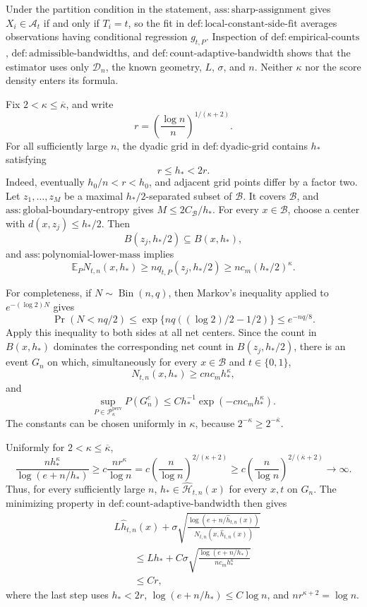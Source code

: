 Under the partition condition in the statement, \(\mathrm{ass:sharp\text{-}assignment}\) gives \(X_i\in\mathcal A_t\) if and only if \(T_i=t\), so the fit in \(\mathrm{def:local\text{-}constant\text{-}side\text{-}fit}\) averages observations having conditional regression \(g_{t,P}\).  Inspection of \(\mathrm{def:empirical\text{-}counts}\), \(\mathrm{def:admissible\text{-}bandwidths}\), and \(\mathrm{def:count\text{-}adaptive\text{-}bandwidth}\) shows that the estimator uses only \(\mathcal D_n\), the known geometry, \(L\), \(\sigma\), and \(n\).  Neither \(\kappa\) nor the score density enters its formula.

Fix \(2<\kappa\le\overline\kappa\), and write
\[
 r=\left(\frac{\log n}{n}\right)^{1/(\kappa+2)}.
\]
For all sufficiently large \(n\), the dyadic grid in \(\mathrm{def:dyadic\text{-}grid}\) contains \(h_*\) satisfying
\[
 r\le h_*<2r.
\]
Indeed, eventually \(h_0/n<r<h_0\), and adjacent grid points differ by a factor two.  Let \(z_1,\ldots,z_M\) be a maximal \(h_*/2\)-separated subset of \(\mathcal B\).  It covers \(\mathcal B\), and \(\mathrm{ass:global\text{-}boundary\text{-}entropy}\) gives \(M\le2C_{\mathcal B}/h_*\).  For every \(x\in\mathcal B\), choose a center with \(d(x,z_j)\le h_*/2\).  Then
\[
 B(z_j,h_*/2)\subseteq B(x,h_*),
\]
and \(\mathrm{ass:polynomial\text{-}lower\text{-}mass}\) implies
\[
 \mathbb E_P N_{t,n}(x,h_*)
 \ge n q_{t,P}(z_j,h_*/2)
 \ge n c_m(h_*/2)^\kappa.
\]

For completeness, if \(N\sim\operatorname{Bin}(n,q)\), then Markov's inequality applied to \(e^{-(\log2)N}\) gives
\[
 \Pr(N<nq/2)
 \le \exp\{nq((\log2)/2-1/2)\}
 \le e^{-nq/8}.
\]
Apply this inequality to both sides at all net centers.  Since the count in \(B(x,h_*)\) dominates the corresponding net count in \(B(z_j,h_*/2)\), there is an event \(G_n\) on which, simultaneously for every \(x\in\mathcal B\) and \(t\in\{0,1\}\),
\[
 N_{t,n}(x,h_*)\ge c n c_mh_*^\kappa,
\]
and
\[
 \sup_{P\in\mathcal P_\kappa^{\mathrm{perv}}}P(G_n^c)
 \le Ch_*^{-1}\exp(-c n c_mh_*^\kappa).
\]
The constants can be chosen uniformly in \(\kappa\), because \(2^{-\kappa}\ge2^{-\overline\kappa}\).

Uniformly for \(2<\kappa\le\overline\kappa\),
\[
 \frac{n h_*^\kappa}{\log(e+n/h_*)}
 \ge c\frac{n r^\kappa}{\log n}
 =c\left(\frac{n}{\log n}\right)^{2/(\kappa+2)}
 \ge c\left(\frac{n}{\log n}\right)^{2/(\overline\kappa+2)}
 \longrightarrow\infty.
\]
Thus, for every sufficiently large \(n\), \(h_*\in\widehat{\mathcal H}_{t,n}(x)\) for every \(x,t\) on \(G_n\).  The minimizing property in \(\mathrm{def:count\text{-}adaptive\text{-}bandwidth}\) then gives
\[
 \begin{aligned}
 &L\widehat h_{t,n}(x)+\sigma
 \sqrt{\frac{\log(e+n/\widehat h_{t,n}(x))}
 {N_{t,n}(x,\widehat h_{t,n}(x))}}\\
 &\qquad\le Lh_*+C\sigma
 \sqrt{\frac{\log(e+n/h_*)}{n c_mh_*^\kappa}}\\
 &\qquad\le Cr,
 \end{aligned}
\]
where the last step uses \(h_*<2r\), \(\log(e+n/h_*)\le C\log n\), and \(nr^{\kappa+2}=\log n\).

